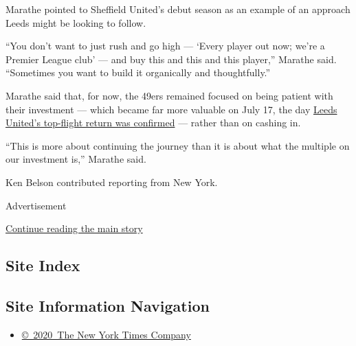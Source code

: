 Marathe pointed to Sheffield United's debut season as an example of an
approach Leeds might be looking to follow.

``You don't want to just rush and go high --- `Every player out now;
we're a Premier League club' --- and buy this and this and this
player,'' Marathe said. ``Sometimes you want to build it organically and
thoughtfully.''

Marathe said that, for now, the 49ers remained focused on being patient
with their investment --- which became far more valuable on July 17, the
day
\href{https://www.nytimes.com/2020/07/18/sports/soccer/leeds-united-premier-league.html}{Leeds
United's top-flight return was confirmed} --- rather than on cashing in.

``This is more about continuing the journey than it is about what the
multiple on our investment is,'' Marathe said.

Ken Belson contributed reporting from New York.

Advertisement

\protect\hyperlink{after-bottom}{Continue reading the main story}

\hypertarget{site-index}{%
\subsection{Site Index}\label{site-index}}

\hypertarget{site-information-navigation}{%
\subsection{Site Information
Navigation}\label{site-information-navigation}}

\begin{itemize}
\tightlist
\item
  \href{https://help.nytimes.com/hc/en-us/articles/115014792127-Copyright-notice}{©~2020~The
  New York Times Company}
\end{itemize}

